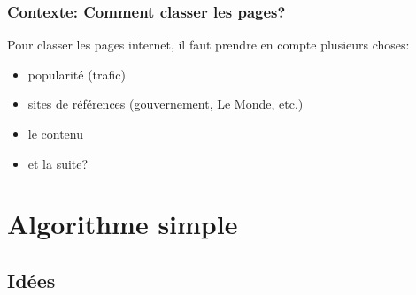 \documentclass{beamer}
\begin{document}
\begin{frame}
  \frametitle{Contexte: Comment classer les pages?}
  
  Pour classer les pages internet, il faut prendre en compte plusieurs
  choses:\\
  
  \begin{itemize}
    \item popularité (trafic)
      \pause
    \item sites de références (gouvernement, Le Monde, etc.)
      \pause
    \item le contenu
      \pause
    \item et la suite?
  \end{itemize}

\end{frame}

\section{Algorithme simple}
\subsection{Idées}


\begin{frame}
  \tableofcontents[currentsection,subsectionstyle=hide]
\end{frame}
\end{document}
